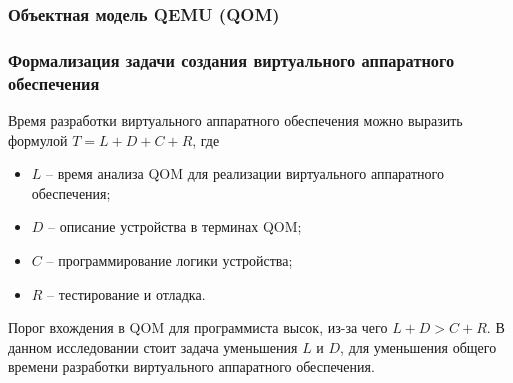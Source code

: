 \begin{frame}%
    \frametitle{Объектная модель QEMU (QOM)}
    \begin{figure}[!htbp]
    \end{figure}
\end{frame}


\begin{frame}%
    \frametitle{Формализация задачи создания виртуального аппаратного обеспечения}
    Время разработки виртуального аппаратного обеспечения
    можно выразить формулой $T = L + D + C + R$, где
    \begin{itemize}
        \item $L$ -- время анализа QOM для реализации виртуального аппаратного обеспечения;
        \item $D$ -- описание устройства в терминах QOM;
        \item $C$ -- программирование логики устройства;
        \item $R$ -- тестирование и отладка.
    \end{itemize}

    Порог вхождения в QOM для программиста высок, из-за чего
    $L + D > C + R$.
    В данном исследовании стоит задача уменьшения $L$ и $D$,
    для уменьшения общего времени разработки виртуального аппаратного
    обеспечения.
\end{frame}


